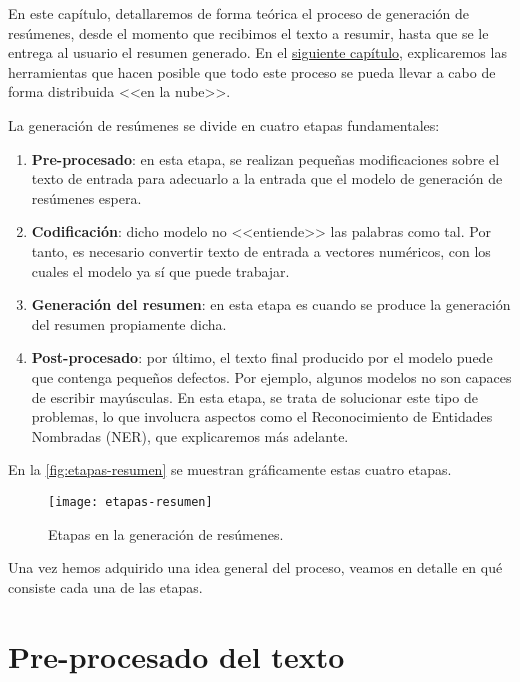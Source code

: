  \label{chapter:conceptos}

En este capítulo, detallaremos de forma teórica el proceso de generación de resúmenes, desde el momento que recibimos el texto a resumir, hasta que se le entrega al usuario el resumen generado. En el \hyperref[chapter:tecnicas]{siguiente capítulo}, explicaremos las herramientas que hacen posible que todo este proceso se pueda llevar a cabo de forma distribuida <<en la nube>>.

La generación de resúmenes se divide en cuatro etapas fundamentales:

\vspace*{-0.3cm}
\begin{enumerate}
	\item  \textbf{Pre-procesado}: en esta etapa, se realizan pequeñas modificaciones sobre el texto de entrada para adecuarlo a la entrada que el modelo de generación de resúmenes espera.
	
	\item \textbf{Codificación}: dicho modelo no <<entiende>> las palabras como tal. Por tanto, es necesario convertir texto de entrada a vectores numéricos, con los cuales el modelo ya sí que puede trabajar.
	
	\item \textbf{Generación del resumen}: en esta etapa es cuando se produce la generación del resumen propiamente dicha.
	
	\item \textbf{Post-procesado}: por último, el texto final producido por el modelo puede que contenga pequeños defectos. Por ejemplo, algunos modelos no son capaces de escribir mayúsculas. En esta etapa, se trata de solucionar este tipo de problemas, lo que involucra aspectos como el Reconocimiento de Entidades Nombradas (NER), que explicaremos más adelante.
\end{enumerate}

En la \autoref{fig:etapas-resumen} se muestran gráficamente estas cuatro etapas.

\begin{figure}[h]
	\centering
	\texttt{[image: etapas-resumen]}
	\caption{Etapas en la generación de resúmenes.}
	\label{fig:etapas-resumen}
\end{figure}

Una vez hemos adquirido una idea general del proceso, veamos en detalle en qué consiste cada una de las etapas.

\bigskip
\section{Pre-procesado del texto} \label{sec:preprocesado}

